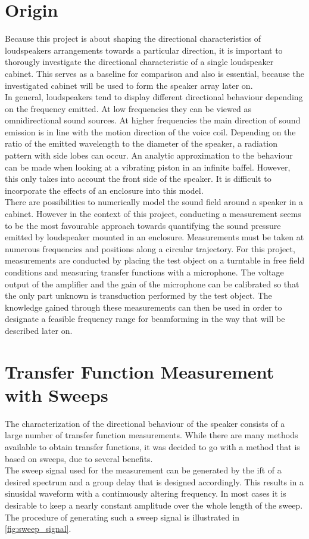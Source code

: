 \section{Origin}\label{ch:polar_response}
Because this project is about shaping the directional characteristics of loudspeakers arrangements towards a particular direction, it is important to thorougly investigate the directional characteristic of a single loudspeaker cabinet. This serves as a baseline for comparison and also is essential, because the investigated cabinet will be used to form the speaker array later on.\\
In general, loudspeakers tend to display different directional behaviour depending on the frequency emitted. At low frequencies they can be viewed as omnidirectional sound sources. At higher frequencies the main direction of sound emission is in line with the motion direction of the voice coil. \citep[p. 910 f.]{crocker98}
Depending on the ratio of the emitted wavelength to the diameter of the speaker, a radiation pattern with side lobes can occur. An analytic approximation to the behaviour can be made  when looking at a vibrating piston in an infinite baffel. However, this only takes into account the front side of the speaker. It is difficult to incorporate the effects of an enclosure into this model.\\
There are possibilities to numerically model the sound field around a speaker in a cabinet. However in the context of this project, conducting a measurement seems to be the most favourable approach towards quantifying the sound pressure emitted by loudspeaker mounted in an enclosure. Measurements must be taken at numerous frequencies and positions along a circular trajectory.
For this project, measurements are conducted by placing the test object on a turntable in free field conditions and measuring transfer functions with a microphone. The voltage output of the amplifier and the gain of the microphone can be calibrated so that the only part unknown is transduction performed by the test object.
The knowledge gained through these measurements can then be used in order to designate a feasible frequency range for beamforming in the way that will be described later on. 

\section{Transfer Function Measurement with Sweeps}\label{sec:sweep_theorie}
The characterization of the directional behaviour of the speaker consists of a large number of transfer function measurements. While there are many methods available to obtain transfer functions, it was decided to go with a method that is based on sweeps, due to several benefits. \citep[p. 3 ff.]{mueller01}\\
The sweep signal used for the measurement can be generated by the \gls{ift} of a desired spectrum and a group delay that is designed accordingly. This results in a sinusidal waveform with a continuously altering frequency. In most cases it is desirable to keep a nearly constant amplitude over the whole length of the sweep. The procedure of generating such a sweep signal is illustrated in \autoref{fig:sweep_signal}.

